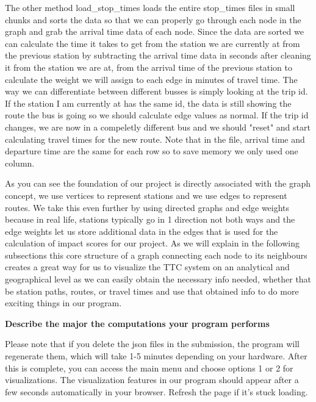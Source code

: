 \documentclass[fontsize=11pt]{article}
\begin{document}
The other method load\_stop\_times loads the entire stop\_times files in small chunks and sorts the data so that we can properly go through each node in the graph and grab the arrival time data of each node. Since the data are sorted we can calculate the time it takes to get from the station we are currently at from the previous station by subtracting the arrival time data in seconds after cleaning it from the station we are at, from the arrival time of the previous station to calculate the weight we will assign to each edge in minutes of travel time. The way we can differentiate between different busses is simply looking at the trip id. If the station I am currently at has the same id, the data is still showing the route the bus is going so we should calculate edge values as normal. If the trip id changes, we are now in a  compeletly different bus and we should "reset" and start calculating travel times for the new route. Note that in the file, arrival time and departure time are the same for each row so to save memory we only used one column.

\vspace{1em}

As you can see the foundation of our project is directly associated with the graph concept, we use vertices to represent stations and we use edges to represent routes. We take this even further by using directed graphs and edge weights because in real life, stations typically go in 1 direction not both ways and the edge weights let us store additional data in the edges that is used for the calculation of impact scores for our project. As we will explain in the following subsections this core structure of a graph connecting each node to its neighbours creates a great way for us to visualize the TTC system on an analytical and geographical level as we can easily obtain the necessary info needed, whether that be station paths, routes, or travel times and use that obtained info to do more exciting things in our program.

\vspace{1em}

\textbf{Describe the major the computations your program performs}

Please note that if you delete the json files in the submission, the program will regenerate them, which will take 1-5 minutes depending on your hardware. After this is complete, you can access the main menu and choose options 1 or 2 for visualizations. The visualization features in our program should appear after a few seconds automatically in your browser. Refresh the page if it's stuck loading.
\end{document}
